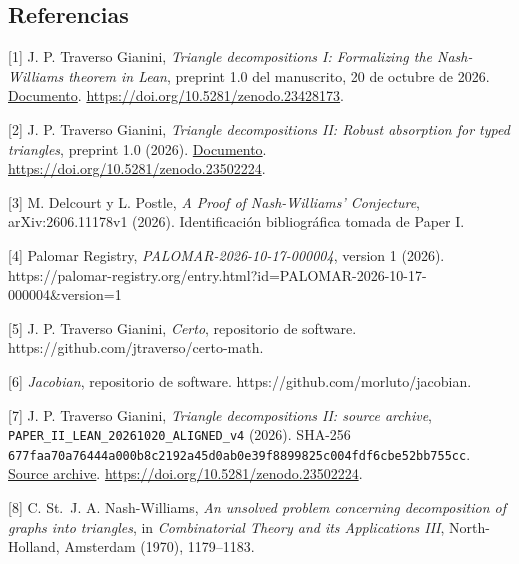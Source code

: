 \documentclass[spanish,11pt,a4paper]{article}
\begin{document}
\noindent\begin{minipage}{\linewidth}
\subsection{Referencias}\label{referencias}

\begingroup\small\raggedright
\setlength{\parskip}{3pt}

{[}1{]} J. P. Traverso Gianini, \emph{Triangle decompositions I: Formalizing the Nash-Williams theorem in Lean}, preprint 1.0 del manuscrito, 20 de octubre de 2026. \href{https://github.com/jtraverso/nash-williams-triangle-decompositions-release/blob/main/preprints/PAPER_I/01_manuscript/PAPER_I_preprint_v1.0_es.md}{Documento}. \url{https://doi.org/10.5281/zenodo.23428173}.

{[}2{]} J. P. Traverso Gianini, \emph{Triangle decompositions II: Robust absorption for typed triangles}, preprint 1.0 (2026). \href{https://github.com/jtraverso/nash-williams-triangle-decompositions-release/blob/main/preprints/PAPER_II/01_manuscript/PAPER_II_preprint_v1.0_es.md}{Documento}. \url{https://doi.org/10.5281/zenodo.23502224}.

{[}3{]} M. Delcourt y L. Postle, \emph{A Proof of Nash-Williams' Conjecture}, arXiv:2606.11178v1 (2026). Identificación bibliográfica tomada de Paper I.

{[}4{]} Palomar Registry, \emph{PALOMAR-2026-10-17-000004}, version 1 (2026). https://palomar-registry.org/entry.html?id=PALOMAR-2026-10-17-000004\&version=1

{[}5{]} J. P. Traverso Gianini, \emph{Certo}, repositorio de software. https://github.com/jtraverso/certo-math.

{[}6{]} \emph{Jacobian}, repositorio de software. https://github.com/morluto/jacobian.

{[}7{]} J. P. Traverso Gianini, \emph{Triangle decompositions II: source archive}, \texttt{PAPER\_\allowbreak{}II\_\allowbreak{}LEAN\_\allowbreak{}20261020\_\allowbreak{}ALIGNED\_\allowbreak{}v4} (2026). SHA-256 \texttt{677faa70\allowbreak{}a76444a0\allowbreak{}00b8c219\allowbreak{}2a45d0ab\allowbreak{}0e39f889\allowbreak{}9825c004\allowbreak{}fdf6cbe5\allowbreak{}2bb755cc}. \href{https://github.com/jtraverso/nash-williams-triangle-decompositions-release/blob/d6d020982ebf3f3cd8c104b6befc6c094850b3e7/archives/PAPER_II_LEAN_20261020_ALIGNED_v4.zip}{Source archive}. \url{https://doi.org/10.5281/zenodo.23502224}.

{[}8{]} C. St.~J. A. Nash-Williams, \emph{An unsolved problem concerning decomposition of graphs into triangles}, in \emph{Combinatorial Theory and its Applications III}, North-Holland, Amsterdam (1970), 1179--1183.


\end{minipage}
\end{document}
